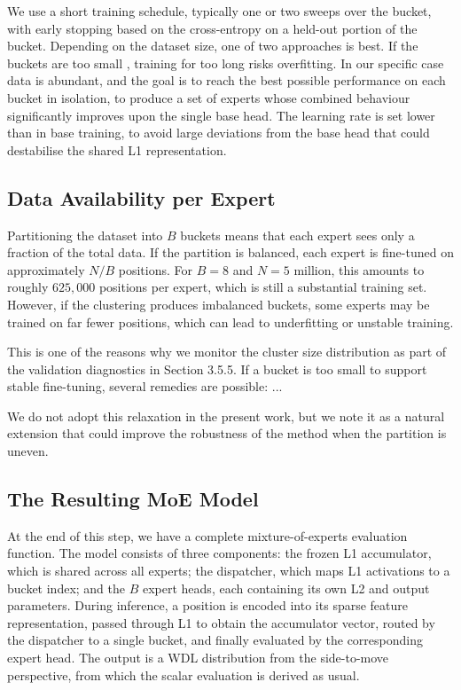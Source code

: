 We use a short training schedule, typically one or two sweeps over the bucket, with early stopping based on the cross-entropy on a held-out portion of the bucket. Depending on the dataset size, one of two approaches is best. If the buckets are too small , training for too long risks overfitting. In our specific case data is abundant, and the goal is to reach the best possible performance on each bucket in isolation, to produce a set of experts whose combined behaviour significantly improves upon the single base head. The learning rate is set lower than in base training, to avoid large deviations from the base head that could destabilise the shared L1 representation.


\subsection{Data Availability per Expert}

Partitioning the dataset into $B$ buckets means that each expert sees only a fraction of the total data. If the partition is balanced, each expert is fine-tuned on approximately $N/B$ positions. For $B=8$ and $N=5$ million, this amounts to roughly $625,000$ positions per expert, which is still a substantial training set. However, if the clustering produces imbalanced buckets, some experts may be trained on far fewer positions, which can lead to underfitting or unstable training.


This is one of the reasons why we monitor the cluster size distribution as part of the validation diagnostics in Section 3.5.5. If a bucket is too small to support stable fine-tuning, several remedies are possible: ...


We do not adopt this relaxation in the present work, but we note it as a natural extension that could improve the robustness of the method when the partition is uneven.


\subsection{The Resulting MoE Model}

At the end of this step, we have a complete mixture-of-experts evaluation function. The model consists of three components: the frozen L1 accumulator, which is shared across all experts; the dispatcher, which maps L1 activations to a bucket index; and the $B$ expert heads, each containing its own L2 and output parameters. During inference, a position is encoded into its sparse feature representation, passed through L1 to obtain the accumulator vector, routed by the dispatcher to a single bucket, and finally evaluated by the corresponding expert head. The output is a WDL distribution from the side-to-move perspective, from which the scalar evaluation is derived as usual.

